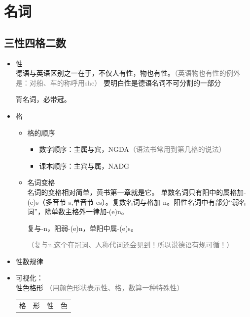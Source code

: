 \chapter{名词}
\section{三性四格二数}
\begin{itemize}
    \item 性 \\
          德语与英语区别之一在于，不仅人有性，物也有性。\textcolor{gray}{（英语物也有性的例外是：对船、车的称呼用she）}
          要明白性是德语名词不可分割的一部分
          \begin{myquote}
              背名词，必带冠。
          \end{myquote}
    \item 格
          \begin{itemize}
              \item 格的顺序
                    \begin{itemize}
                        \item 数字顺序：主属与宾，NGDA\textcolor{gray}{（语法书常用到第几格的说法）}
                        \item 课本顺序：主宾与属，NADG
                    \end{itemize}
              \item 名词变格 \\
                    名词的变格相对简单，黄书第一章就是它。
                    单数名词只有阳中的属格加-(e)s（多音节-s,单音节-es）。复数名词与格加-n。阳性名词中有部分“弱名词”，除单数主格外一律加-(e)n。
                    \begin{myquote}
                        复与-n，阳弱-(e)n，单阳中属-(e)s。
                    \end{myquote}
                    \textcolor{gray}{（复与n,这个在冠词、人称代词还会见到！所以说德语有规可循！）}
          \end{itemize}
    \item 性数规律
    \item 可视化：\\
          性色格形
          \textcolor{gray}{（用颜色形状表示性、格，数算一种特殊性）} \\
          \renewcommand{\arraystretch}{1.5}{
              \begin{tabular}{|M{2.5em}|M{3em}|M{2.5em}|M{3em}|}
                  \hline
                  格 & 形                 & 性 & 色               \\

\end{tabular}}
\end{itemize}
